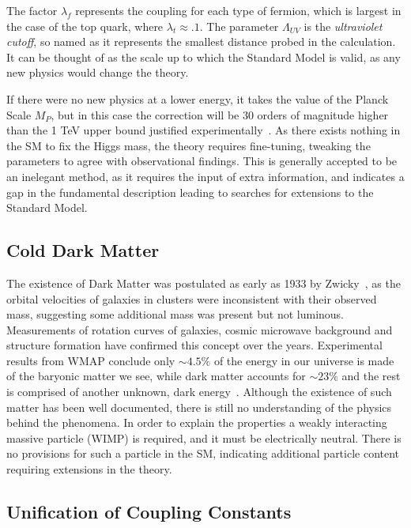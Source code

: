 The factor $\lambda_{f}$  represents the coupling for each type of fermion, which is largest in the case of the top quark, where $\lambda_{t} \approx. 1$. The parameter $\Lambda_{UV}$ is the \textit{ultraviolet cutoff}, so named as it represents the smallest distance probed in the calculation. It can be thought of as the scale up to which the Standard Model is valid, as any new physics would change the theory.

 If there were no new physics at a lower energy, it takes the value of the Planck Scale $M_{P}$, but in this case the correction will be 30 orders of magnitude higher than the 1 TeV upper bound justified experimentally~\cite{Drees}. As there exists nothing in the SM to fix the Higgs mass, the theory requires fine-tuning, tweaking the parameters to agree with observational findings. This is generally accepted to be an inelegant method, as it requires the input of extra information, and indicates a gap in the fundamental description leading to searches for extensions to the Standard Model. 

\subsection{Cold Dark Matter}

The existence of Dark Matter was postulated as early as 1933 by Zwicky~\cite{zwicky}, as the orbital velocities of galaxies in clusters were inconsistent with their observed mass, suggesting some additional mass was present but not luminous.  Measurements of rotation curves of galaxies, cosmic microwave background and structure formation have confirmed this concept over the years. Experimental results from WMAP conclude only $\sim 4.5\%$ of the energy in our universe is made of the baryonic matter we see, while dark matter accounts for $\sim 23\%$ and the rest is comprised of another unknown, dark energy~\cite{WMAP5}. Although the existence of such matter has been well documented, there is still no understanding of the physics behind the phenomena. In order to explain the properties a weakly interacting massive particle (WIMP) is required, and it must be electrically neutral. There is no provisions for such a particle in the SM, indicating additional particle content requiring extensions in the theory. 

\subsection{Unification of Coupling Constants}

